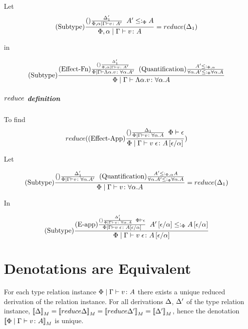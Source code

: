 {        Let
        \begin{equation}
            (\text{Subtype}) \frac{(\text{}) \frac{\Delta_1'}{\Phi,\alpha\mid\Gamma \vdash v \colon A'}\;\; A'\leq:_\Phi A}{\Phi,\alpha\mid\Gamma \vdash v \colon A} = reduce(\Delta_1)
        \end{equation}

        in 

        \begin{equation}
            (\text{Subtype}) \frac{
                (\text{Effect-Fn}) \frac{
                    (\text{}) \frac{\Delta_1'}{\Phi,\alpha\mid\Gamma \vdash v \colon A'}
                }{
                    \Phi\mid\Gamma \vdash \Lambda \alpha. v \colon \forall \alpha. A'
                }
            \;\; 
            (\text{Quantification}) \frac{A' \leq:_{\Phi,\alpha}}{\forall \alpha. A' \leq:_\Phi \forall \alpha. A}
            }{
                \Phi\mid\Gamma \vdash \Lambda \alpha. v \colon \forall \alpha. A
            }
        \end{equation}

        \subparagraph{$reduce$ definition}

        
        To find 
        \begin{equation}
            reduce((\text{Effect-App}) \frac{(\text{}) \frac{\Delta_1}{\Phi\mid\Gamma \vdash v \colon \forall \alpha. A}\;\;\Phi\vdash \epsilon}{\Phi\mid\Gamma \vdash v\;\epsilon \colon A\left[\epsilon / \alpha\right]})
        \end{equation}

        Let

        \begin{eqnarray}
            (\text{Subtype}) \frac{
                (\text{}) \frac{\Delta_1'}{\Phi\mid\Gamma \vdash v \colon \forall \alpha. A'}
                \;\; 
                (\text{Quantification}) \frac{A'\leq:_{\Phi,\alpha}A}{\forall \alpha. A'\leq:_\Phi\forall \alpha. A}
            }{
                \Phi\mid\Gamma \vdash v \colon \forall \alpha. A
            }= reduce(\Delta_1)
        \end{eqnarray}

        In

        \begin{equation}
            (\text{Subtype}) \frac{
                (\text{E-app}) \frac{
                    (\text{}) \frac{\Delta_1'}{\Phi\mid\Gamma \vdash v \colon \forall \alpha. A}\;\;\Phi\vdash \epsilon
                }{\Phi\mid\Gamma \vdash v\;\epsilon \colon A\left[\epsilon / \alpha\right]}
            \;\;
            A'\left[\epsilon / \alpha\right]\leq:_\Phi A\left[\epsilon / \alpha\right]
            }{
                \Phi\mid\Gamma \vdash v\;\epsilon \colon A\left[\epsilon / \alpha\right]
            }
        \end{equation}
        
            

    
    \section{Denotations are Equivalent}
    For each type relation instance $\Phi\mid\Gamma \vdash v \colon A$ there exists a unique reduced derivation of the relation instance. For all derivations $\Delta$, $\Delta'$ of the type relation instance, $\deno{\D} = \deno{\reduce{\D}} = \deno{\reduce{\D'}} = \deno{\D'} $, hence the denotation ${\bf [\![}\Phi\mid\Gamma \vdash v \colon A{\bf ]\!]}_M$ is unique.
}

\ifdefined\NoDocument
\else
\documentclass{report}


    \UniqueDenotations

\fi